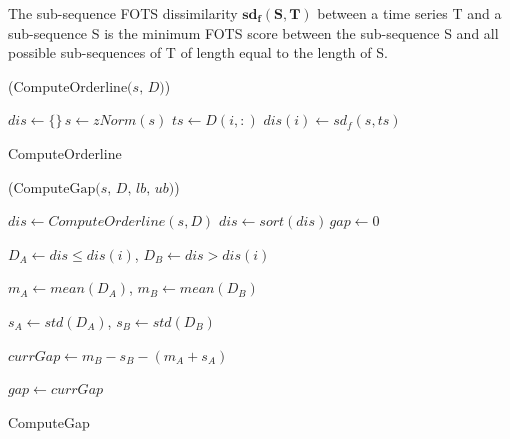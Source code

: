   
  

 \begin{definition}
The sub-sequence FOTS dissimilarity $\boldsymbol{sd_f(S, T)}$ between
a time series T and a sub-sequence S is the minimum  FOTS
score between the sub-sequence S and all possible
sub-sequences of T of length equal to the length of S.
\end{definition}


\begin{algorithm}[h]
\DontPrintSemicolon
{}

\Begin($\text{ComputeOrderline} {(} s, \, D{)}$)
{
  $dis \leftarrow \{\} \, s \leftarrow zNorm(s)$\;
  {
    $ts \leftarrow D(i,:)$\;
    $dis(i) \leftarrow sd_f(s,ts)$\;    
  }  

}
\caption{ComputeOrderline}
\label{algo1}
\end{algorithm}



\begin{algorithm}[h]
\DontPrintSemicolon
{}

\Begin($\text{ComputeGap} {(} s, \, D, \, lb, \, ub{)}$)
{
  $dis \leftarrow ComputeOrderline(s,D)$\;
  $dis \leftarrow sort(dis)\, gap \leftarrow 0$\;

  
    {
        $D_A \leftarrow dis \leq dis(i)$,
        $D_B \leftarrow dis > dis(i)$
     
       $m_A \leftarrow mean(D_A) $,
       $ m_B \leftarrow mean(D_B)$\;
       
       $s_A \leftarrow std(D_A)$,
       $s_B \leftarrow std(D_B)$\;
       
       $currGap \leftarrow m_B - s_B - (m_A + s_A)$
       
       {
       	$gap \leftarrow currGap$
       } 
      
    }  

}
\caption{ComputeGap}
\label{algo2}
\end{algorithm}

